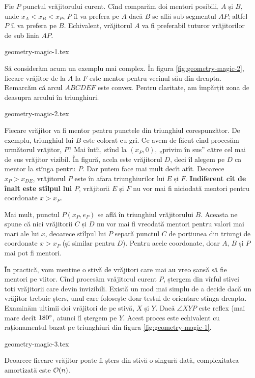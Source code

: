 \documentclass[../main.tex]{subfiles}
\begin{document}
Fie $P$ punctul vrăjitorului curent. Cînd comparăm doi mentori posibili, $A$ și $B$, unde $x_A < x_B < x_P$, $P$ îl va prefera pe $A$ dacă $B$ se află sub segmentul $AP$; altfel $P$ îl va prefera pe $B$. Echivalent, vrăjitorul $A$ va fi preferabil tuturor vrăjitorilor de sub linia $AP$.

{geometry-magic-1.tex}

Să considerăm acum un exemplu mai complex. În figura \ref{fig:geometry-magic-2}, fiecare vrăjitor de la $A$ la $F$ este mentor pentru vecinul său din dreapta. Remarcăm că arcul $ABCDEF$ este convex. Pentru claritate, am împărțit zona de deasupra arcului în triunghiuri.

{geometry-magic-2.tex}

Fiecare vrăjitor va fi mentor pentru punctele din triunghiul corespunzător. De exemplu, triunghiul lui $B$ este colorat cu gri. Ce avem de făcut cînd procesăm următorul vrăjitor, $P$? Mai întîi, stînd la $(x_P, 0)$, „privim în sus” către cel mai de sus vrăjitor vizibil. În figură, acela este vrăjitorul $D$, deci îl alegem pe $D$ ca mentor la stînga pentru $P$. Dar putem face mai mult decît atît. Deoarece $x_P > x_{DE}$, vrăjitorul $P$ este în afara triunghiurilor lui $E$ și $F$. \textbf{Indiferent cît de înalt este stîlpul lui $P$}, vrăjitorii $E$ și $F$ nu vor mai fi niciodată mentori pentru coordonate $x > x_P$.

Mai mult, punctul $P(x_P, e_P)$ se află în triunghiul vrăjitorului $B$. Aceasta ne spune că nici vrăjitorii $C$ și $D$ nu vor mai fi vreodată mentori pentru valori mai mari ale lui $x$, deoarece stîlpul lui $P$ separă punctul $C$ de porțiunea din triungi de coordonate $x > x_P$ (și similar pentru $D$). Pentru acele coordonate, doar $A$, $B$ și $P$ mai pot fi mentori.

În practică, vom menține o stivă de vrăjitori care mai au vreo șansă să fie mentori pe viitor. Cînd procesăm vrăjitorul curent $P$, ștergem din vîrful stivei toți vrăjitorii care devin invizibili. Există un mod mai simplu de a decide dacă un vrăjitor trebuie șters, unul care folosește doar testul de orientare stînga-dreapta. Examinăm ultimii doi vrăjitori de pe stivă, $X$ și $Y$. Dacă $\angle XYP$ este reflex (mai mare decît $180\degree$, atunci îl ștergem pe $Y$. Acest proces este echivalent cu raționamentul bazat pe triunghiuri din figura \ref{fig:geometry-magic-1}.

{geometry-magic-3.tex}

Deoarece fiecare vrăjitor poate fi șters din stivă o singură dată, complexitatea amortizată este $\mathcal{O}(n)$.
\end{document}

